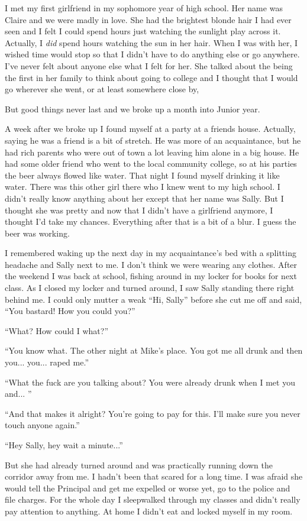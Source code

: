 \documentclass[12pt,letterpaper]{article}
\begin{document}
I met my first girlfriend in my sophomore year of high school. Her name was Claire and we were madly in love. She had the brightest blonde hair I had ever seen and I felt I could spend hours just watching the sunlight play across it. Actually, I \textit{did} spend hours watching the sun in her hair. When I was with her, I wished time would stop so that I didn't have to do anything else or go anywhere. I've never felt about anyone else what I felt for her. She talked about the being the first in her family to think about going to college and I thought that I would go wherever she went, or at least somewhere close by,

But good things never last and we broke up a month into Junior year.

A week after we broke up I found myself at a party at a friends house. Actually, saying he was a friend is a bit of stretch. He was more of an acquaintance, but he had rich parents who were out of town a lot leaving him alone in a big house. He had some older friend who went to the local community college, so at his parties the beer always flowed like water. That night I found myself drinking it like water. There was this other girl there who I knew went to my high school. I didn't really know anything about her except that her name was Sally. But I thought she was pretty and now that I didn't have a girlfriend anymore, I thought I'd take my chances. Everything after that is a bit of a blur. I guess the beer was working.

I remembered waking up the next day in my acquaintance's bed with a splitting headache and Sally next to me. I don't think we were wearing any clothes. After the weekend I was back at school, fishing around in my locker for books for next class. As I closed my locker and turned around, I saw Sally standing there right behind me. I could only mutter a weak ``Hi, Sally'' before she cut me off and said, ``You bastard! How you could you?''

``What? How could I what?''

``You know what. The other night at Mike's place. You got me all drunk and then you... you... raped me.''

``What the fuck are you talking about? You were already drunk when I met you and... ''

``And that makes it alright? You're going to pay for this. I'll make sure you never touch anyone again.''

``Hey Sally, hey wait a minute...''

But she had already turned around and was practically running down the corridor away from me. I hadn't been that scared for a long time. I was afraid she would tell the Principal and get me expelled or worse yet, go to the police and file charges. For the whole day I sleepwalked through my classes and didn't really pay attention to anything. At home I didn't eat and locked myself in my room.
\end{document}
